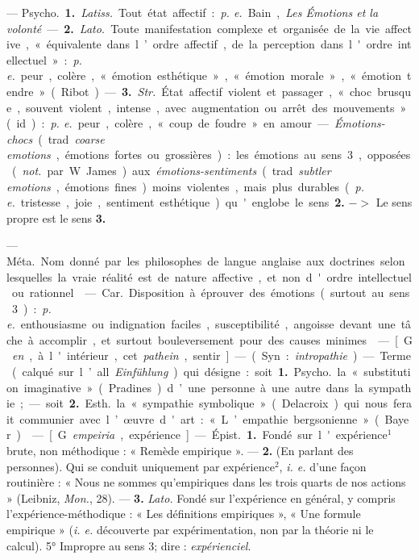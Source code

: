 \begin{itemize}[leftmargin=1cm, label=, itemsep=1pt]
 — \si{Psycho.} {\bf 1.} {\it Latiss.} Tout
état affectif : {\it p. e.} Bain, {\it Les Émotions
et la volonté}. — {\bf 2.} {\it Lato.} Toute manifestation complexe et organisée de la vie affective, « équivalente
dans l’ordre affectif, de la perception dans l'ordre intellectuel » :
{\it p. e.} peur, colère, « émotion esthétique », « émotion morale », « émotion tendre » (Ribot). — {\bf 3.} {\it Str.}
État affectif violent et passager,
« choc brusque, souvent violent,
intense, avec augmentation ou arrêt
des mouvements » (id.) : {\it p. e.} peur,
colère, « coup de foudre » en amour.
— {\it Émotions-chocs} (trad. {\it coarse emotions}, émotions fortes
ou grossières) : les émotions au sens 3, opposées
({\it not.} par W. James) aux {\it émotions-sentiments} (trad.
{\it subtler emotions}, émotions fines) moins violentes,
mais plus durables ({\it p. e.} tristesse,
joie, sentiment esthétique) qu'englobe le sens {\bf 2.} $->$ Le sens propre
est le sens {\bf 3.}

 —  \si{Méta.} Nom donné par les philosophes de
langue anglaise aux doctrines selon lesquelles la vraie réalité est de nature
affective, et non d'ordre intellectuel ou rationnel.

 — \si{Car.} Disposition à
éprouver des émotions (surtout au sens 3) : {\it p. e.} enthousiasme ou
indignation faciles, susceptibilité, angoisse devant une tâche à
accomplir, et surtout bouleversement pour des causes minimes.

 — [G. {\it en}, à l'intérieur, cet
{\it pathein}, sentir] — (Syn. : {\it intropathie}).
— Terme (calqué sur l’all. {\it Einfühlung}) qui désigne : soit
{\bf 1.} \si{Psycho.} la
« substitution imaginative » (Pradines) d’une personne à une autre
dans la sympathie; — soit {\bf 2.} \si{Esth.}
la « sympathie symbolique » (Delacroix) qui nous ferait communier
avec l’œuvre d'art : « L’empathie
bergsonienne » (Bayer).

 — [G. {\it empeiria}, expérience]
— \si{Épist.} {\bf 1.} Fondé sur l'expérience$^1$
brute, non méthodique : « Remède empirique ». — {\bf 2.} (En parlant des
personnes). Qui se conduit uniquement par expérience$^2$, {\it i. e.} d'une
façon routinière : « Nous ne sommes qu’empiriques dans les trois quarts
de nos actions » (Leibniz, {\it Mon.}, 28).
— {\bf 3.} {\it Lato.} Fondé sur l'expérience
en général, y compris l’expérience-méthodique : « Les définitions
empiriques », « Une formule empirique » ({\it i. e.} découverte par
expérimentation, non par la théorie ni le
calcul). 5° Impropre au sens 3; dire : {\it expérienciel}.


\end{itemize}
